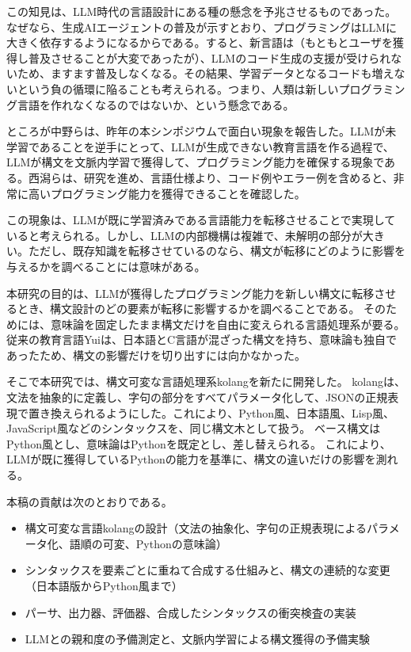 \documentclass{ipsjprosym}
\begin{document}
この知見は、LLM時代の言語設計にある種の懸念を予兆させるものであった。なぜなら、生成AIエージェントの普及が示すとおり、プログラミングはLLMに大きく依存するようになるからである。すると、新言語は（もともとユーザを獲得し普及させることが大変であったが）、LLMのコード生成の支援が受けられないため、ますます普及しなくなる。その結果、学習データとなるコードも増えないという負の循環に陥ることも考えられる。つまり、人類は新しいプログラミング言語を作れなくなるのではないか、という懸念である。

ところが中野ら\cite{Kuramitsu2026Nanako,Nakano2026ProSym}は、昨年の本シンポジウムで面白い現象を報告した。LLMが未学習であることを逆手にとって、LLMが生成できない教育言語を作る過程で、LLMが構文を文脈内学習で獲得して、プログラミング能力を確保する現象である。西潟らは\cite{Nishigata2026NLP,Moribe2026Untrained}、研究を進め、言語仕様より、コード例やエラー例を含めると、非常に高いプログラミング能力を獲得できることを確認した。

この現象は、LLMが既に学習済みである言語能力を転移させることで実現していると考えられる。しかし、LLMの内部機構は複雑で、未解明の部分が大きい。ただし、既存知識を転移させているのなら、構文が転移にどのように影響を与えるかを調べることには意味がある。

本研究の目的は、LLMが獲得したプログラミング能力を新しい構文に転移させるとき、構文設計のどの要素が転移に影響するかを調べることである。
そのためには、意味論を固定したまま構文だけを自由に変えられる言語処理系が要る。
従来の教育言語Yuiは、日本語とC言語が混ざった構文を持ち、意味論も独自であったため、構文の影響だけを切り出すには向かなかった。

そこで本研究では、構文可変な言語処理系kolangを新たに開発した。
kolangは、文法を抽象的に定義し、字句の部分をすべてパラメータ化して、JSONの正規表現で置き換えられるようにした。これにより、Python風、日本語風、Lisp風、JavaScript風などのシンタックスを、同じ構文木として扱う。
ベース構文はPython風とし、意味論はPythonを既定とし、差し替えられる。
これにより、LLMが既に獲得しているPythonの能力を基準に、構文の違いだけの影響を測れる。

本稿の貢献は次のとおりである。
\begin{itemize}
  \item 構文可変な言語kolangの設計（文法の抽象化、字句の正規表現によるパラメータ化、語順の可変、Pythonの意味論）
  \item シンタックスを要素ごとに重ねて合成する仕組みと、構文の連続的な変更（日本語版からPython風まで）
  \item パーサ、出力器、評価器、合成したシンタックスの衝突検査の実装
  \item LLMとの親和度の予備測定と、文脈内学習による構文獲得の予備実験
\end{itemize}
\end{document}
